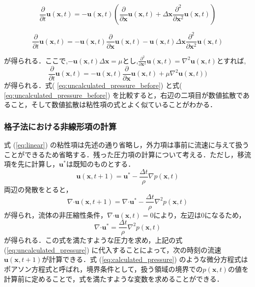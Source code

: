 \documentclass[a4j,12pt]{jreport}
\begin{document}
$$\frac{\partial}{\partial t}\bm{u} (\bm{x},t)  =  -\bm{u} (\bm{x},t) \left (\frac{\partial}{\partial \bm{x}}\bm{u} (\bm{x},t)  + \varDelta \bm{x}\frac{\partial^2}{\partial \bm{x}^2}\bm{u} (\bm{x},t)  \right) $$

$$ \frac{\partial}{\partial t}\bm{u} (\bm{x},t)  =  -\bm{u} (\bm{x},t) \frac{\partial}{\partial \bm{x}}\bm{u} (\bm{x},t)  -\bm{u} (\bm{x},t) \varDelta \bm{x}\frac{\partial^2}{\partial \bm{x}^2}\bm{u} (\bm{x},t) $$

が得られる．ここで,$ -\bm{u} (\bm{x},t) \varDelta \bm{x} = \mu$とし,$\frac{\partial^2}{\partial \bm{x}^2}\bm{u} (\bm{x},t)  = \nabla^2\bm{u} (\bm{x},t) $とすれば,
\begin{equation}\label{eq:uncalculated_pressure_after}
\frac{\partial}{\partial t}\bm{u} (\bm{x},t)  =  -\bm{u} (\bm{x},t) \frac{\partial}{\partial \bm{x}}\bm{u} (\bm{x},t)  +\mu\nabla^2\bm{u} (\bm{x},t) ) 
\end{equation} 
が得られる．式( \ref{eq:uncalculated_pressure_before}) と式( \ref{eq:uncalculated_pressure_before}) を比較すると，右辺の二項目が数値拡散であること，そして数値拡散は粘性項の式とよく似ていることがわかる．
\subsubsection{格子法における非線形項の計算} \label{subsec:gridpressure}
式 (\ref{eq:linear}) の粘性項は先述の通り省略し，外力項は事前に流速に与えて扱うことができるため省略する．残った圧力項の計算について考える．ただし，移流項を先に計算し，$\bm{u}^*$は既知のものとする．
\begin{equation}\label{eq:uncalculated_pressure}
\bm{u} (\bm{x},t+1)  =  \bm{u}^* - \frac{\varDelta t}{\rho}\nabla p (\bm{x},t) 
\end{equation} 
両辺の発散をとると，
$$\nabla\boldsymbol{\cdot}\bm{u} (\bm{x},t+1)  =  \nabla\boldsymbol{\cdot}\bm{u}^* - \frac{\varDelta t}{\rho}\nabla^2 p (\bm{x},t) $$
が得られ，流体の非圧縮性条件，$\nabla\boldsymbol{\cdot}\bm{u} (\bm{x},t)  = 0$により，左辺は0になるため，
\begin{equation}\label{eq:calculated_pressure}
\nabla\boldsymbol{\cdot}\bm{u}^* = \frac{\varDelta t}{\rho}\nabla^2 p (\bm{x},t) 
\end{equation} 
が得られる．この式を満たすような圧力を求め，上記の式 (\ref{eq:uncalculated_pressure}) に代入することによって，次の時刻の流速$\bm{u} (\bm{x},t+1) $が計算できる．式 (\ref{eq:calculated_pressure}) のような微分方程式はポアソン方程式と呼ばれ，境界条件として，扱う領域の境界での$p (\bm{x},t) $の値を計算前に定めることで，式を満たすような変数を求めることができる．
\end{document}
